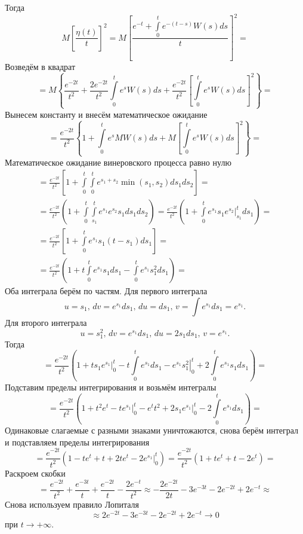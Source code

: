 Тогда
$$M \left[ \frac{ \eta \left( t \right) }{t} \right]^2 =
  M \left[
    \frac{e^{-t} + \int \limits_0^t e^{-\left( t - s \right) } W \left( s \right) ds}{t}
  \right]^2 =$$
Возведём в квадрат
$$= M \left\{
    \frac{e^{-2t}}{t^2} + \frac{2e^{-2t}}{t^2} \int \limits_0^t e^s W \left( s \right) ds +
    \frac{e^{-2t}}{t^2} \left[ \int \limits_0^t e^s W \left( s \right) ds \right]^2 \right\} =$$
Вынесем константу и внесём математическое ожидание
$$= \frac{e^{-2t}}{t^2} \left\{
    1 + \int \limits_0^t e^s MW \left( s \right) ds +
    M \left[ \int \limits_0^t e^s W \left( s \right) ds \right]^2 \right\} =$$
Математическое ожидание винеровского процесса равно нулю
\begin{gather*}
  = \frac{e^{-2t}}{t^2} \left[
    1 + \int \limits_0^t \int \limits_0^t e^{s_1 + s_2} \min \left( s_1, s_2 \right) ds_1 ds_2
  \right] = \\
  = \frac{e^{-2t}}{t^2} \left(
    1 + \int \limits_0^t \int \limits_{s_1}^t e^{s_1} e^{s_2} s_1 ds_1 ds_2 \right) =
  \frac{e^{-2t}}{t^2}
  \left( 1 + \int \limits_0^t e^{s_1} s_1 \left. e^{s_2} \right|_{s_1 }^t ds_1 \right) = \\
  = \frac{e^{-2t}}{t^2}
  \left[ 1 + \int \limits_0^t e^{s_1} s_1 \left( t - s_1 \right) ds_1 \right] = \\
  = \frac{e^{-2t}}{t^2}
  \left( 1 + t \int \limits_0^t e^{s_1} s_1 ds_1 - \int \limits_0^t e^{s_1} s_1^2 ds_1 \right) =
\end{gather*}
Оба интеграла берём по частям.
Для первого интеграла
$$u = s_1, \,
  dv = e^{s_1} ds_1, \,
  du = ds_1, \,
  v = \int \limits e^{s_1} ds_1 = e^{s_1}.$$
Для второго интеграла
$$u = s_1^2, \,
  dv = e^{s_1} ds_1, \,
  du = 2s_1 ds_1, \,
  v = e^{s_1}.$$
Тогда
$$= \frac{e^{-2t}}{t^2} \left(
    1 + \left. ts_1 e^{s_1} \right|_0^t - t \int \limits_0^t e^{s_1} ds_1 -
    \left. e^{s_1} s_1^2 \right|_0^t + 2 \int \limits_0^t e^{s_1} s_1 ds_1 \right) =$$
Подставим пределы интегрирования и возьмём интегралы
$$= \frac{e^{-2t}}{t^2} \left(
    1 + t^2 e^t - \left. te^{s_1} \right|_0^t - e^t t^2 + 2 \left. s_1 e^{s_1} \right|_0^t -
    2 \int \limits_0^t e^{s_1} ds_1 \right) =$$
Одинаковые слагаемые с разными знаками уничтожаются,
снова берём интеграл и подставляем пределы интегрирования
$$= \frac{e^{-2t}}{t^2} \left( 1 - te^t + t + 2te^t - 2 \left. e^{s_1} \right|_0^t \right) =
  \frac{e^{-2t}}{t^2} \left( 1 + te^t + t - 2e^t \right) =$$
Раскроем скобки
$$= \frac{e^{-2t}}{t^2} + \frac{e^{-3t}}{t} + \frac{e^{-2t}}{t} - \frac{2e^{-t}}{t^2} \approx
  -\frac{2e^{-2t}}{2t} - 3e^{-3t} - 2e^{-2t} + 2e^{-t} \approx$$
Снова используем правило Лопиталя
$$ \approx 2e^{-2t} - 3e^{-3t} - 2e^{-2t} + 2e^{-t} \to 0$$
при $t \to +\infty$.


